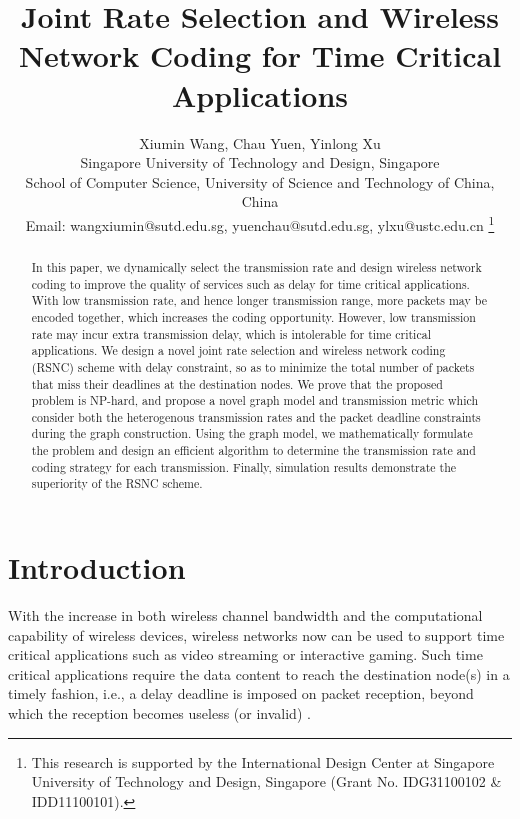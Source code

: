 \documentclass[journal]{IEEEtran}
\begin{document}
\title{Joint Rate Selection and Wireless Network Coding for Time Critical Applications}
\author{
\small Xiumin Wang, Chau Yuen, Yinlong Xu\\
 Singapore University of Technology and Design, Singapore\\
 School of Computer Science, University of Science and Technology of China, China\\
\small Email: wangxiumin@sutd.edu.sg, yuenchau@sutd.edu.sg, ylxu@ustc.edu.cn
\thanks{This research is supported by the International Design Center at Singapore University of Technology and Design, Singapore (Grant No. IDG31100102 \& IDD11100101).}}
\maketitle

\begin{abstract}
In this paper, we  dynamically select the transmission rate and design wireless network coding to improve the quality of services such as delay for time critical applications.
With low transmission rate, and hence longer transmission range, more packets may be encoded together, which increases the coding opportunity. However, low transmission rate may incur extra transmission delay, which is intolerable for time critical applications.
We design a novel joint rate selection and wireless network coding (RSNC) scheme with delay constraint, so as to minimize the total number of packets that miss their deadlines at the destination nodes. We prove that the proposed problem is NP-hard, and propose a novel graph model and transmission metric which consider
both the heterogenous transmission rates and the packet deadline constraints during the graph construction. Using the graph model, we mathematically formulate the problem and design an efficient
algorithm to determine the transmission rate and coding strategy for each transmission. Finally, simulation results demonstrate the superiority of the RSNC scheme.
\end{abstract}

\vspace{-0.1in}
\section{Introduction}
With the increase in both wireless channel bandwidth and the computational capability of wireless devices, wireless networks
now can be used to support time critical applications such as video streaming or interactive gaming. Such time critical applications require the data content to reach the destination node(s) in a timely fashion, i.e., a delay deadline is imposed on packet reception, beyond which the reception becomes useless (or invalid) \cite{XTL2006Time-critical14}.
\end{document}
